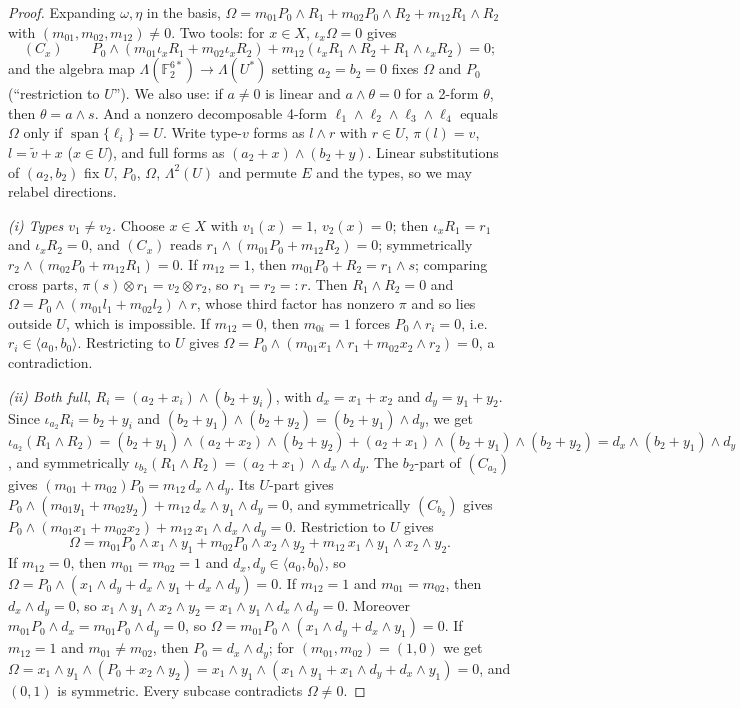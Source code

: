 \documentclass[11pt,a4paper]{article}
\theoremstyle{plain}
\theoremstyle{remark}
\newcommand{\F}{\mathbb F_2}
\newcommand{\Span}{\operatorname{span}}
\newcommand{\Lam}{\Lambda^2}
\begin{document}
\begin{proof}
Expanding $\omega,\eta$ in the basis, $\Omega=m_{01}P_0\wedge R_1+m_{02}P_0\wedge R_2+m_{12}R_1\wedge R_2$ with $(m_{01},m_{02},m_{12})\neq0$. Two tools: for $x\in X$, $\iota_x\Omega=0$ gives
\[
(C_x)\qquad P_0\wedge(m_{01}\iota_xR_1+m_{02}\iota_xR_2)+m_{12}(\iota_xR_1\wedge R_2+R_1\wedge\iota_xR_2)=0;
\]
and the algebra map $\Lambda(\F^{6*})\to\Lambda(U^*)$ setting $a_2=b_2=0$ fixes $\Omega$ and $P_0$ (``restriction to $U$''). We also use: if $a\neq0$ is linear and $a\wedge\theta=0$ for a 2-form $\theta$, then $\theta=a\wedge s$. And a nonzero decomposable 4-form $\ell_1\wedge\ell_2\wedge\ell_3\wedge\ell_4$ equals $\Omega$ only if $\Span\{\ell_i\}=U$. Write type-$v$ forms as $l\wedge r$ with $r\in U$, $\pi(l)=v$, $l=\tilde v+x$ ($x\in U$), and full forms as $(a_2+x)\wedge(b_2+y)$. Linear substitutions of $(a_2,b_2)$ fix $U$, $P_0$, $\Omega$, $\Lam(U)$ and permute $E$ and the types, so we may relabel directions.

\emph{(i) Types $v_1\neq v_2$.} Choose $x\in X$ with $v_1(x)=1$, $v_2(x)=0$; then $\iota_xR_1=r_1$ and $\iota_xR_2=0$, and $(C_x)$ reads $r_1\wedge(m_{01}P_0+m_{12}R_2)=0$; symmetrically $r_2\wedge(m_{02}P_0+m_{12}R_1)=0$.
If $m_{12}=1$, then $m_{01}P_0+R_2=r_1\wedge s$; comparing cross parts, $\pi(s)\otimes r_1=v_2\otimes r_2$, so $r_1=r_2=:r$. Then $R_1\wedge R_2=0$ and $\Omega=P_0\wedge(m_{01}l_1+m_{02}l_2)\wedge r$, whose third factor has nonzero $\pi$ and so lies outside $U$, which is impossible.
If $m_{12}=0$, then $m_{0i}=1$ forces $P_0\wedge r_i=0$, i.e.\ $r_i\in\langle a_0,b_0\rangle$. Restricting to $U$ gives $\Omega=P_0\wedge(m_{01}x_1\wedge r_1+m_{02}x_2\wedge r_2)=0$, a contradiction.

\emph{(ii) Both full}, $R_i=(a_2+x_i)\wedge(b_2+y_i)$, with $d_x=x_1+x_2$ and $d_y=y_1+y_2$. Since $\iota_{a_2}R_i=b_2+y_i$ and $(b_2+y_1)\wedge(b_2+y_2)=(b_2+y_1)\wedge d_y$, we get $\iota_{a_2}(R_1\wedge R_2)=(b_2+y_1)\wedge(a_2+x_2)\wedge(b_2+y_2)+(a_2+x_1)\wedge(b_2+y_1)\wedge(b_2+y_2)=d_x\wedge(b_2+y_1)\wedge d_y$, and symmetrically $\iota_{b_2}(R_1\wedge R_2)=(a_2+x_1)\wedge d_x\wedge d_y$. The $b_2$-part of $(C_{a_2})$ gives $(m_{01}+m_{02})P_0=m_{12}\,d_x\wedge d_y$. Its $U$-part gives $P_0\wedge(m_{01}y_1+m_{02}y_2)+m_{12}\,d_x\wedge y_1\wedge d_y=0$, and symmetrically $(C_{b_2})$ gives $P_0\wedge(m_{01}x_1+m_{02}x_2)+m_{12}\,x_1\wedge d_x\wedge d_y=0$. Restriction to $U$ gives
\[
\Omega=m_{01}P_0\wedge x_1\wedge y_1+m_{02}P_0\wedge x_2\wedge y_2+m_{12}\,x_1\wedge y_1\wedge x_2\wedge y_2 .
\]
If $m_{12}=0$, then $m_{01}=m_{02}=1$ and $d_x,d_y\in\langle a_0,b_0\rangle$, so $\Omega=P_0\wedge(x_1\wedge d_y+d_x\wedge y_1+d_x\wedge d_y)=0$.
If $m_{12}=1$ and $m_{01}=m_{02}$, then $d_x\wedge d_y=0$, so $x_1\wedge y_1\wedge x_2\wedge y_2=x_1\wedge y_1\wedge d_x\wedge d_y=0$. Moreover $m_{01}P_0\wedge d_x=m_{01}P_0\wedge d_y=0$, so $\Omega=m_{01}P_0\wedge(x_1\wedge d_y+d_x\wedge y_1)=0$.
If $m_{12}=1$ and $m_{01}\neq m_{02}$, then $P_0=d_x\wedge d_y$; for $(m_{01},m_{02})=(1,0)$ we get $\Omega=x_1\wedge y_1\wedge(P_0+x_2\wedge y_2)=x_1\wedge y_1\wedge(x_1\wedge y_1+x_1\wedge d_y+d_x\wedge y_1)=0$, and $(0,1)$ is symmetric. Every subcase contradicts $\Omega\neq0$.


\end{proof}
\end{document}
